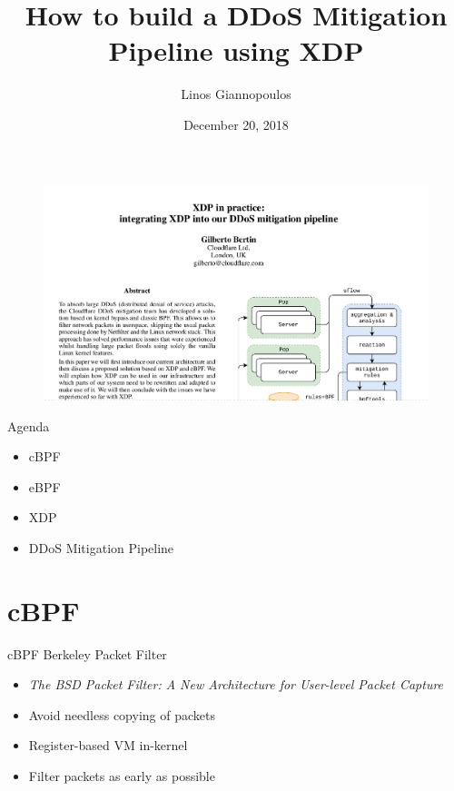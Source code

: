 \documentclass{beamer}
\title[How to build a DDoS Mitigation Pipeline using XDP]{How to build a DDoS Mitigation Pipeline using XDP}
\author{Linos Giannopoulos}
\date{December 20, 2018}
\begin{document}
\begin{frame}
\titlepage
\end{frame}

\begin{frame}[c]
  \begin{figure}
    \includegraphics[width=\textwidth]{./paper.png}
  \end{figure}
\end{frame}

\begin{frame}{Agenda}
  \begin{itemize}
    \item cBPF
    \item eBPF
    \item XDP
    \item DDoS Mitigation Pipeline
  \end{itemize}
\end{frame}

\section{cBPF}
\begin{frame}{cBPF}
Berkeley Packet Filter
\begin{itemize}
\item \textit{The BSD Packet Filter: A New Architecture for User-level Packet Capture}
\item Avoid needless copying of packets
\item Register-based VM in-kernel
\item Filter packets as early as possible
\end{itemize}
\end{frame}
\end{document}

